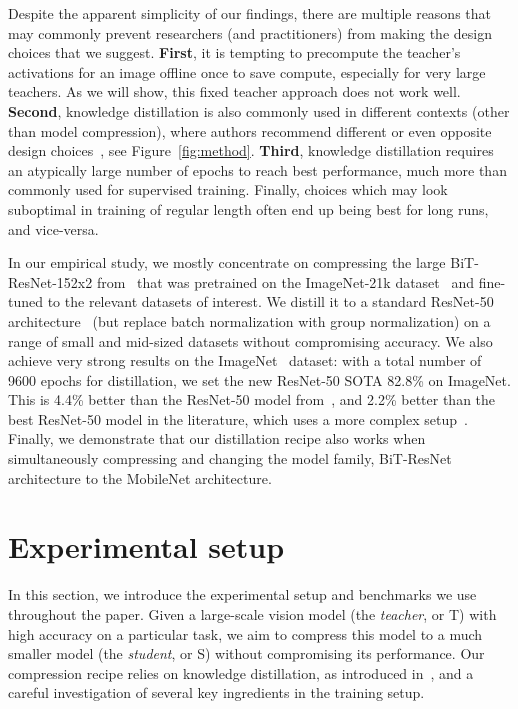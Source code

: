 \documentclass[10pt,twocolumn,letterpaper]{article}
\begin{document}
Despite the apparent simplicity of our findings, there are multiple reasons that may commonly prevent researchers (and practitioners) from making the design choices that we suggest.
\textbf{First}, it is tempting to precompute the teacher's activations for an image offline once to save compute, especially for very large teachers. As we will show, this fixed teacher approach does not work well.
\textbf{Second}, knowledge distillation is also commonly used in different contexts (other than model compression), where authors recommend different or even opposite design choices~\cite{xie2020self,tarvainen2017mean,yun2021re}, see Figure~\ref{fig:method}.
\textbf{Third}, knowledge distillation requires an atypically large number of epochs to reach best performance, much more than commonly used for supervised training.   
Finally, choices which may look suboptimal in training of regular length often end up being best for long runs, and vice-versa. 
 
In our empirical study, we mostly concentrate on compressing the large BiT-ResNet-152x2 from~\cite{brain2020bit} that was pretrained on the ImageNet-21k dataset~\cite{russakovsky2015imagenet} and fine-tuned to the relevant datasets of interest. We distill it to a standard ResNet-50 architecture~\cite{he2016deep} (but replace batch normalization with group normalization) on a range of small and mid-sized datasets without compromising accuracy.
We also achieve very strong results on the ImageNet~\cite{imagenet} dataset: with a total number of 9600 epochs for distillation, we set the new ResNet-50 SOTA 82.8\% on ImageNet. This is 4.4\% better than the ResNet-50 model from~\cite{brain2020bit}, and 2.2\% better than the best ResNet-50 model in the literature, which uses a more complex setup~\cite{shen2020mealv2}.
Finally, we demonstrate that our distillation recipe also works when simultaneously compressing and changing the model family, \eg BiT-ResNet architecture to the MobileNet architecture.

\section{Experimental setup}\label{sec:setup}


In this section, we introduce the experimental setup and benchmarks we use throughout the paper. Given a large-scale vision model (the \emph{teacher}, or T) with high accuracy on a particular task, we aim to compress this model to a much smaller model (the \emph{student}, or S) without compromising its performance. 
Our compression recipe relies on knowledge distillation, as introduced in~\cite{hinton},  and a careful investigation of several key ingredients in the training setup.
\end{document}

